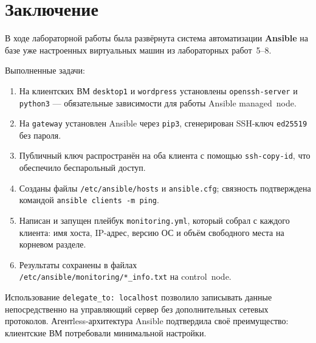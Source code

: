 \chapter*{Заключение}
\label{ch:conclusion}

В ходе лабораторной работы была развёрнута система автоматизации
\textbf{Ansible} на базе уже настроенных виртуальных машин из
лабораторных работ~5--8.

Выполненные задачи:
\begin{enumerate}
  \item На клиентских ВМ \texttt{desktop1} и \texttt{wordpress} установлены
        \texttt{openssh-server} и \texttt{python3} — обязательные зависимости
        для работы Ansible managed~node.
  \item На \texttt{gateway} установлен Ansible через \texttt{pip3},
        сгенерирован SSH-ключ \texttt{ed25519} без пароля.
  \item Публичный ключ распространён на оба клиента с помощью
        \texttt{ssh-copy-id}, что обеспечило беспарольный доступ.
  \item Созданы файлы \texttt{/etc/ansible/hosts} и \texttt{ansible.cfg};
        связность подтверждена командой \texttt{ansible clients -m ping}.
  \item Написан и запущен плейбук \texttt{monitoring.yml}, который собрал
        с каждого клиента: имя хоста, IP-адрес, версию ОС
        и объём свободного места на корневом разделе.
  \item Результаты сохранены в файлах\\
        \texttt{/etc/ansible/monitoring/*\_info.txt} на control~node.
\end{enumerate}

Использование \texttt{delegate\_to: localhost} позволило записывать
данные непосредственно на управляющий сервер без дополнительных сетевых
протоколов. Агентless-архитектура Ansible подтвердила своё преимущество:
клиентские ВМ потребовали минимальной настройки.

\endinput
